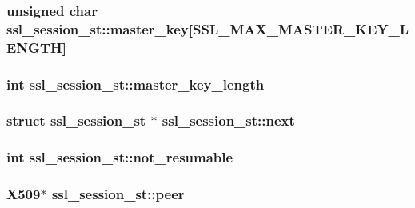 \hypertarget{structssl__session__st_ae0d5ecf4472dbff80b1ed36ce9c051c3}{
\subsubsection[{master\-\_\-key}]{\setlength{\rightskip}{0pt plus 5cm}unsigned char ssl\-\_\-session\-\_\-st\-::master\-\_\-key\mbox{[}{\bf S\-S\-L\-\_\-\-M\-A\-X\-\_\-\-M\-A\-S\-T\-E\-R\-\_\-\-K\-E\-Y\-\_\-\-L\-E\-N\-G\-T\-H}\mbox{]}}}\label{structssl__session__st_ae0d5ecf4472dbff80b1ed36ce9c051c3}
\hypertarget{structssl__session__st_a368c71211d55bcd3528a752c15e14e5d}{
\subsubsection[{master\-\_\-key\-\_\-length}]{\setlength{\rightskip}{0pt plus 5cm}int ssl\-\_\-session\-\_\-st\-::master\-\_\-key\-\_\-length}}\label{structssl__session__st_a368c71211d55bcd3528a752c15e14e5d}
\hypertarget{structssl__session__st_accaac56bcf65fe7626e21071e3253d0e}{
\subsubsection[{next}]{\setlength{\rightskip}{0pt plus 5cm}struct {\bf ssl\-\_\-session\-\_\-st} $\ast$ ssl\-\_\-session\-\_\-st\-::next}}\label{structssl__session__st_accaac56bcf65fe7626e21071e3253d0e}
\hypertarget{structssl__session__st_a1b4d198b4cf95c73b1e73b06cf521bac}{
\subsubsection[{not\-\_\-resumable}]{\setlength{\rightskip}{0pt plus 5cm}int ssl\-\_\-session\-\_\-st\-::not\-\_\-resumable}}\label{structssl__session__st_a1b4d198b4cf95c73b1e73b06cf521bac}
\hypertarget{structssl__session__st_a925bea83587ffedbbdb4aa386b75a2d7}{
\subsubsection[{peer}]{\setlength{\rightskip}{0pt plus 5cm}X509$\ast$ ssl\-\_\-session\-\_\-st\-::peer}}\label{structssl__session__st_a925bea83587ffedbbdb4aa386b75a2d7}
